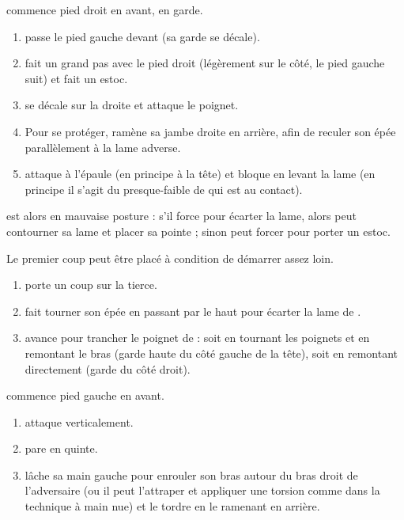 \begin{technique}

\A commence pied droit en avant, en garde.

\begin{enumerate}
	\item \A passe le pied gauche devant (sa garde se décale).
	
	\item \A fait un grand pas avec le pied droit (légèrement sur le côté, le pied gauche suit) et fait un estoc.
	
	\item \D se décale sur la droite et attaque le poignet.
	
	\item Pour se protéger, \A ramène sa jambe droite en arrière, afin de reculer son épée parallèlement à la lame adverse.
	
	\item \D attaque à l'épaule (en principe à la tête) et \A bloque en levant la lame (en principe il s'agit du presque-faible de \D qui est au contact).
\end{enumerate}

\A est alors en mauvaise posture : s'il force pour écarter la lame, alors \D peut contourner sa lame et placer sa pointe ; sinon \D peut forcer pour porter un estoc.

Le premier coup peut être placé à condition de démarrer assez loin.
\end{technique}


\begin{technique}

\begin{enumerate}
	\item \A porte un coup sur la tierce.
	
	\item \D fait tourner son épée en passant par le haut pour écarter la lame de \A.
	
	\item \D avance pour trancher le poignet de \A : soit en tournant les poignets et en remontant le bras (garde haute du côté gauche de la tête), soit en remontant directement (garde du côté droit).
\end{enumerate}
\end{technique}


\begin{technique}

\D commence pied gauche en avant.

\begin{enumerate}
	\item \A attaque verticalement.
	
	\item \D pare en quinte. 
	
	\item \D lâche sa main gauche pour enrouler son bras autour du bras droit de l'adversaire (ou il peut l'attraper et appliquer une torsion comme dans la technique à main nue) et le tordre en le ramenant en arrière.
\end{enumerate}
\end{technique}


